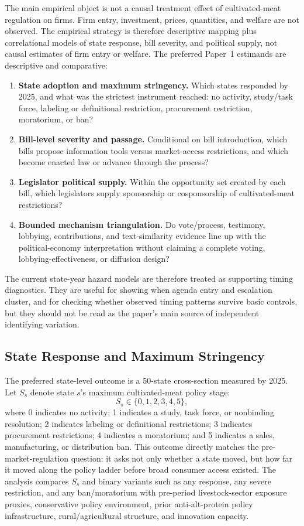 \documentclass[12pt]{article}
\begin{document}
The main empirical object is not a causal treatment effect of cultivated-meat regulation on firms.  Firm entry, investment, prices, quantities, and welfare are not observed.  The empirical strategy is therefore descriptive mapping plus correlational models of state response, bill severity, and political supply, not causal estimates of firm entry or welfare.  The preferred Paper~1 estimands are descriptive and comparative:

\begin{enumerate}
    \item \textbf{State adoption and maximum stringency.}  Which states responded by 2025, and what was the strictest instrument reached: no activity, study/task force, labeling or definitional restriction, procurement restriction, moratorium, or ban?
    \item \textbf{Bill-level severity and passage.}  Conditional on bill introduction, which bills propose information tools versus market-access restrictions, and which become enacted law or advance through the process?
    \item \textbf{Legislator political supply.}  Within the opportunity set created by each bill, which legislators supply sponsorship or cosponsorship of cultivated-meat restrictions?
    \item \textbf{Bounded mechanism triangulation.}  Do vote/process, testimony, lobbying, contributions, and text-similarity evidence line up with the political-economy interpretation without claiming a complete voting, lobbying-effectiveness, or diffusion design?
\end{enumerate}

The current state-year hazard models are therefore treated as supporting timing diagnostics.  They are useful for showing when agenda entry and escalation cluster, and for checking whether observed timing patterns survive basic controls, but they should not be read as the paper's main source of independent identifying variation.

\subsection{State Response and Maximum Stringency}

The preferred state-level outcome is a 50-state cross-section measured by 2025.  Let $S_s$ denote state $s$'s maximum cultivated-meat policy stage:
\[
S_s \in \{0,1,2,3,4,5\},
\]
where 0 indicates no activity; 1 indicates a study, task force, or nonbinding resolution; 2 indicates labeling or definitional restrictions; 3 indicates procurement restrictions; 4 indicates a moratorium; and 5 indicates a sales, manufacturing, or distribution ban.  This outcome directly matches the pre-market-regulation question: it asks not only whether a state moved, but how far it moved along the policy ladder before broad consumer access existed.  The analysis compares $S_s$ and binary variants such as any response, any severe restriction, and any ban/moratorium with pre-period livestock-sector exposure proxies, conservative policy environment, prior anti-alt-protein policy infrastructure, rural/agricultural structure, and innovation capacity.
\end{document}
